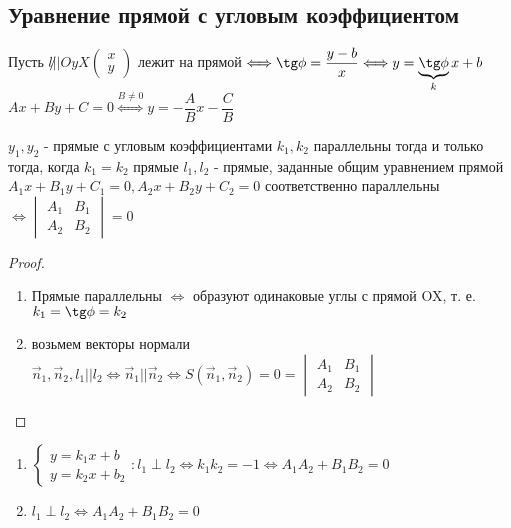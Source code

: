 \subsection{Уравнение прямой с угловым коэффициентом}
Пусть \(l \not|| Oy X \begin{pmatrix}
	x \\ y
\end{pmatrix}\) лежит на прямой \(\Longleftrightarrow \tg \phi = \dfrac{y - b}{x}\Longleftrightarrow y = \underbrace{\tg\phi}_{k} x + b\) \newline
\(Ax+By+C = 0 \overset{B\ne0}{\Longleftrightarrow} y = -\dfrac{A}{B}x - \dfrac{C}{B}\) 
\begin{proposition}
	\(y_1, y_2 \) - прямые с угловым коэффициентами \(k_1, k_2\) параллельны тогда и только тогда, когда \(k_1 = k_2\) \newline
	прямые \(l_1, l_2\) - прямые, заданные общим уравнением прямой \(A_1x+B_1y+C_1 = 0, A_2x+B_2y+C_2 = 0\) соответственно параллельны \(\Longleftrightarrow \begin{vmatrix}
		A_1 & B_1 \\ A_2 & B_2
	\end{vmatrix} = 0\)
\end{proposition}
\begin{proof}
	\begin{enumerate}
		\item Прямые параллельны \(\Longleftrightarrow\) образуют одинаковые углы с прямой OX, т. е. \(k_1 = \tg\phi = k_2\)
		\item возьмем векторы нормали \(\vec n_1, \vec n_2, l_1 || l_2 \Longleftrightarrow \vec n_1 || \vec n_2 \Longleftrightarrow S(\vec n_1, \vec n_2) = 0 = \begin{vmatrix}
			A_1 & B_1 \\
			A_2 & B_2
		\end{vmatrix}\)
	\end{enumerate}
\end{proof}
\begin{proposition}
	\begin{enumerate}
		\item \(\left\{
		\begin{gathered}
			y = k_1x+b \\
			y = k_2x+b_2
		\end{gathered}
		\right.: l_1 \perp l_2 \Longleftrightarrow k_1k_2 = -1 \Longleftrightarrow A_1A_2 + B_1B_2 = 0\)
		\item \(l_1 \perp l_2 \Longleftrightarrow A_1A_2 + B_1B_2 = 0\)
	\end{enumerate}
\end{proposition}
